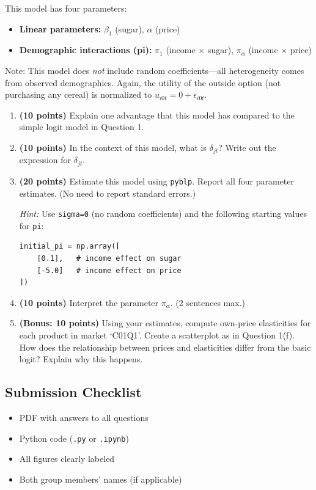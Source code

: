 \documentclass[11pt]{article}
\begin{document}
This model has four parameters:
\begin{itemize}
	\item \textbf{Linear parameters:} $\beta_1$ (sugar), $\alpha$ (price)
	\item \textbf{Demographic interactions (pi):} $\pi_1$ (income $\times$ sugar), $\pi_\alpha$ (income $\times$ price)
\end{itemize}

Note: This model does \textit{not} include random coefficients---all heterogeneity comes from observed demographics. Again, the utility of the outside option (not purchasing any cereal) is normalized to $u_{i0t} = 0 + \epsilon_{i0t}$.

\begin{enumerate}
	\item \textbf{(10 points)} Explain one advantage that this model has compared to the simple logit model in Question 1.

	\item \textbf{(10 points)} In the context of this model, what is $\delta_{jt}$? Write out the expression for $\delta_{jt}$.

	\item \textbf{(20 points)} Estimate this model using \texttt{pyblp}. Report all four parameter estimates. (No need to report standard errors.)

	\textit{Hint:} Use \texttt{sigma=0} (no random coefficients) and the following starting values for \texttt{pi}:
\begin{verbatim}
initial_pi = np.array([
    [0.1],   # income effect on sugar
    [-5.0]   # income effect on price
])
\end{verbatim}

	\item \textbf{(10 points)} Interpret the parameter $\pi_\alpha$. (2 sentences max.)

	\item \textbf{(Bonus: 10 points)} Using your estimates, compute own-price elasticities for each product in market `C01Q1'. Create a scatterplot as in Question 1(f). How does the relationship between prices and elasticities differ from the basic logit? Explain why this happens.
\end{enumerate}

\subsection*{Submission Checklist}
\begin{itemize}
	\item[$\square$] PDF with answers to all questions
	\item[$\square$] Python code (\texttt{.py} or \texttt{.ipynb})
	\item[$\square$] All figures clearly labeled
	\item[$\square$] Both group members' names (if applicable)
\end{itemize}
\end{document}
